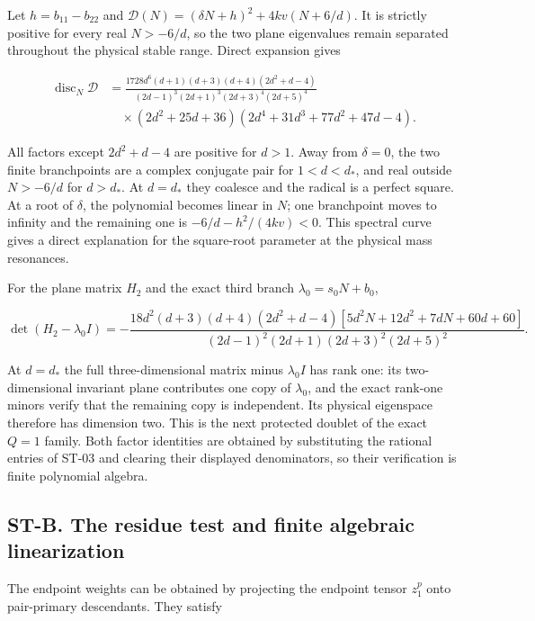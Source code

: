 \documentclass[a4paper,11pt]{article}
\numberwithin{equation}{section}
\begin{document}
Let \(h=b_{11}-b_{22}\) and \(\mathcal D(N)=(\delta N+h)^2+4kv(N+6/d)\). It is strictly positive for every real \(N>-6/d\), so the two plane eigenvalues remain separated throughout the physical stable range. Direct expansion gives

\[
\begin{aligned}
\operatorname{disc}_N\mathcal D&=
\frac{1728d^6(d+1)(d+3)(d+4)(2d^2+d-4)}
{(2d-1)^3(2d+1)^3(2d+3)^4(2d+5)^4}\\
&\quad\times(2d^2+25d+36)(2d^4+31d^3+77d^2+47d-4).
\end{aligned}
\]

All factors except \(2d^2+d-4\) are positive for \(d>1\). Away from \(\delta=0\), the two finite branchpoints are a complex conjugate pair for \(1<d<d_*\), and real outside \(N>-6/d\) for \(d>d_*\). At \(d=d_*\) they coalesce and the radical is a perfect square. At a root of \(\delta\), the polynomial becomes linear in \(N\); one branchpoint moves to infinity and the remaining one is \(-6/d-h^2/(4kv)<0\). This spectral curve gives a direct explanation for the square-root parameter at the physical mass resonances.

For the plane matrix \(H_2\) and the exact third branch \(\lambda_0=s_0N+b_0\),

\[
\det(H_2-\lambda_0I)=
-\frac{18d^2(d+3)(d+4)(2d^2+d-4)
[5d^2N+12d^2+7dN+60d+60]}
{(2d-1)^2(2d+1)(2d+3)^2(2d+5)^2}.
\]

At \(d=d_*\) the full three-dimensional matrix minus \(\lambda_0I\) has rank one: its two-dimensional invariant plane contributes one copy of \(\lambda_0\), and the exact rank-one minors verify that the remaining copy is independent. Its physical eigenspace therefore has dimension two. This is the next protected doublet of the exact \(Q=1\) family. Both factor identities are obtained by substituting the rational entries of ST-03 and clearing their displayed denominators, so their verification is finite polynomial algebra.

\hypertarget{st-b.-the-residue-test-and-finite-algebraic-linearization}{%
\subsection{ST-B. The residue test and finite algebraic linearization}\label{st-b.-the-residue-test-and-finite-algebraic-linearization}}

The endpoint weights can be obtained by projecting the endpoint tensor \(z_1^p\) onto pair-primary descendants. They satisfy
\end{document}
